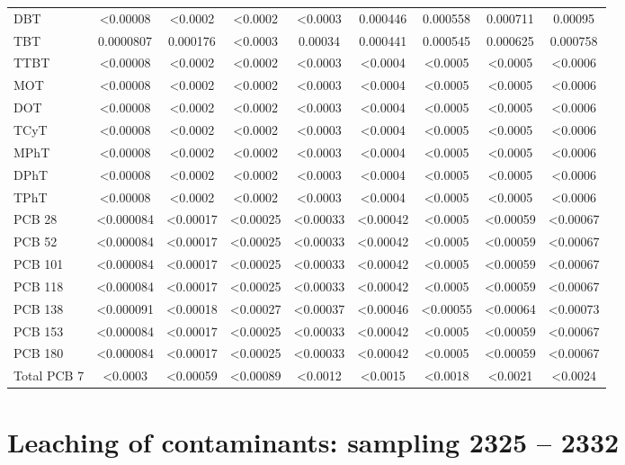 \documentclass[algorithms,article,submit,pdftex,moreauthors]{Definitions/mdpi}
\begin{document}
\begin{scriptsize}
\begin{center}
\begin{longtable}{@{\extracolsep{\fill}}|p{1.8cm}|cccccccc|@{}}
DBT & <0.00008 & <0.0002 & <0.0002 & <0.0003 & 0.000446 & 0.000558 & 0.000711 & 0.00095 \\
TBT & 0.0000807 & 0.000176 & <0.0003 & 0.00034 & 0.000441 & 0.000545 & 0.000625 & 0.000758 \\
TTBT & <0.00008 & <0.0002 & <0.0002 & <0.0003 & <0.0004 & <0.0005 &<0.0005 & <0.0006 \\
MOT & <0.00008 & <0.0002 & <0.0002 & <0.0003 & <0.0004 & <0.0005 &<0.0005 & <0.0006 \\
DOT & <0.00008 & <0.0002 & <0.0002 & <0.0003 & <0.0004 & <0.0005 &<0.0005 & <0.0006 \\
TCyT & <0.00008 & <0.0002 & <0.0002 & <0.0003 & <0.0004 & <0.0005 &<0.0005 & <0.0006 \\
MPhT & <0.00008 & <0.0002 & <0.0002 & <0.0003 & <0.0004 & <0.0005 &<0.0005 & <0.0006 \\
DPhT & <0.00008 & <0.0002 & <0.0002 & <0.0003 & <0.0004 & <0.0005 &<0.0005 & <0.0006 \\
TPhT & <0.00008 & <0.0002 & <0.0002 & <0.0003 & <0.0004 & <0.0005 &<0.0005 & <0.0006 \\
PCB 28 & <0.000084 & <0.00017 & <0.00025 & <0.00033 & <0.00042 & <0.0005 & <0.00059 & <0.00067 \\
PCB 52 & <0.000084 & <0.00017 & <0.00025 & <0.00033 & <0.00042 & <0.0005 & <0.00059 & <0.00067 \\
PCB 101 & <0.000084 & <0.00017 & <0.00025 & <0.00033 & <0.00042 & <0.0005 & <0.00059 & <0.00067 \\
PCB 118 & <0.000084 & <0.00017 & <0.00025 & <0.00033 & <0.00042 & <0.0005 & <0.00059 & <0.00067 \\
PCB 138 & <0.000091 & <0.00018 & <0.00027 & <0.00037 & <0.00046 & <0.00055 & <0.00064 & <0.00073 \\
PCB 153 & <0.000084 & <0.00017 & <0.00025 & <0.00033 & <0.00042 & <0.0005 & <0.00059 & <0.00067 \\
PCB 180 & <0.000084 & <0.00017 & <0.00025 & <0.00033 & <0.00042 & <0.0005 & <0.00059 & <0.00067 \\
Total PCB 7 & <0.0003 & <0.00059 & <0.00089 & <0.0012 & <0.0015 & <0.0018 & <0.0021 & <0.0024 \\
%
\end{longtable}
\end{center}
\end{scriptsize}

\section[\appendixname~\thesection]{Leaching of contaminants: sampling 2325 -- 2332}\label{AppB1}
\end{document}
